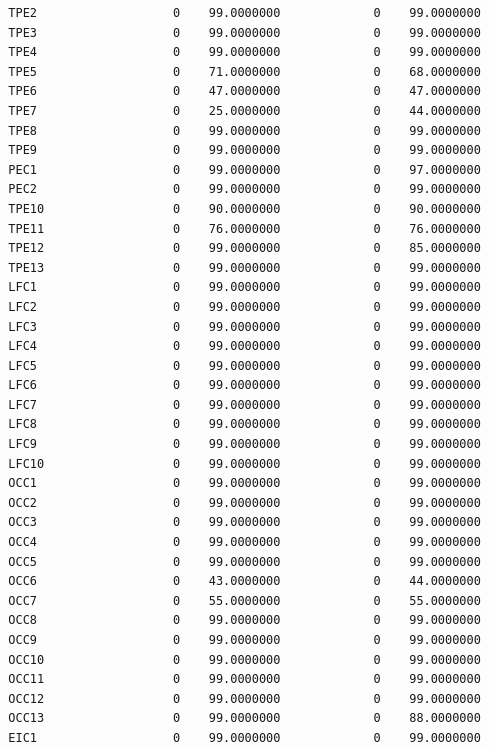 \documentclass[
  11pt,
  a4paper,
  DIV=12,captions=tableheading,oneside,titlepage]{scrbook}
\begin{document}
\begin{verbatim}
  TPE2                   0    99.0000000             0    99.0000000 
  TPE3                   0    99.0000000             0    99.0000000 
  TPE4                   0    99.0000000             0    99.0000000 
  TPE5                   0    71.0000000             0    68.0000000 
  TPE6                   0    47.0000000             0    47.0000000 
  TPE7                   0    25.0000000             0    44.0000000 
  TPE8                   0    99.0000000             0    99.0000000 
  TPE9                   0    99.0000000             0    99.0000000 
  PEC1                   0    99.0000000             0    97.0000000 
  PEC2                   0    99.0000000             0    99.0000000 
  TPE10                  0    90.0000000             0    90.0000000 
  TPE11                  0    76.0000000             0    76.0000000 
  TPE12                  0    99.0000000             0    85.0000000 
  TPE13                  0    99.0000000             0    99.0000000 
  LFC1                   0    99.0000000             0    99.0000000 
  LFC2                   0    99.0000000             0    99.0000000 
  LFC3                   0    99.0000000             0    99.0000000 
  LFC4                   0    99.0000000             0    99.0000000 
  LFC5                   0    99.0000000             0    99.0000000 
  LFC6                   0    99.0000000             0    99.0000000 
  LFC7                   0    99.0000000             0    99.0000000 
  LFC8                   0    99.0000000             0    99.0000000 
  LFC9                   0    99.0000000             0    99.0000000 
  LFC10                  0    99.0000000             0    99.0000000 
  OCC1                   0    99.0000000             0    99.0000000 
  OCC2                   0    99.0000000             0    99.0000000 
  OCC3                   0    99.0000000             0    99.0000000 
  OCC4                   0    99.0000000             0    99.0000000 
  OCC5                   0    99.0000000             0    99.0000000 
  OCC6                   0    43.0000000             0    44.0000000 
  OCC7                   0    55.0000000             0    55.0000000 
  OCC8                   0    99.0000000             0    99.0000000 
  OCC9                   0    99.0000000             0    99.0000000 
  OCC10                  0    99.0000000             0    99.0000000 
  OCC11                  0    99.0000000             0    99.0000000 
  OCC12                  0    99.0000000             0    99.0000000 
  OCC13                  0    99.0000000             0    88.0000000 
  EIC1                   0    99.0000000             0    99.0000000 

\end{verbatim}
\end{document}
